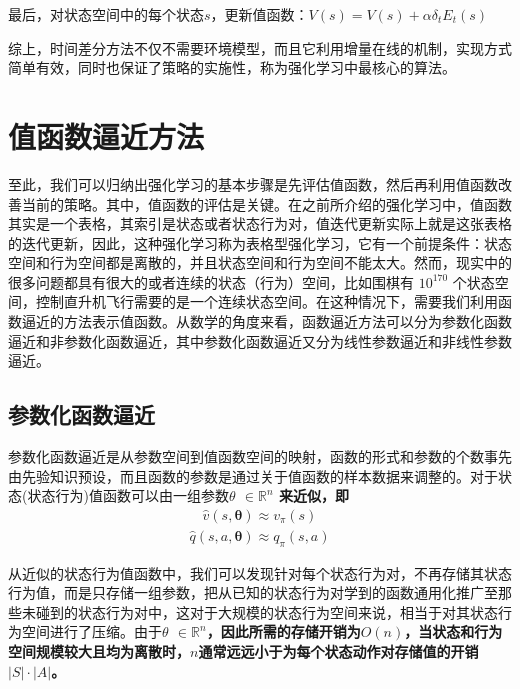最后，对状态空间中的每个状态$s$，更新值函数：$V(s)=V(s)+\alpha \delta_{t} E_{t}(s)$

综上，时间差分方法不仅不需要环境模型，而且它利用增量在线的机制，实现方式简单有效，同时也保证了策略的实施性，称为强化学习中最核心的算法。

\section{值函数逼近方法}
至此，我们可以归纳出强化学习的基本步骤是先评估值函数，然后再利用值函数改善当前的策略。其中，值函数的评估是关键。在之前所介绍的强化学习中，值函数其实是一个表格，其索引是状态或者状态行为对，值迭代更新实际上就是这张表格的迭代更新，因此，这种强化学习称为表格型强化学习，它有一个前提条件：状态空间和行为空间都是离散的，并且状态空间和行为空间不能太大。然而，现实中的很多问题都具有很大的或者连续的状态（行为）空间，比如围棋有 $10^{170}$  个状态空间，控制直升机飞行需要的是一个连续状态空间。在这种情况下，需要我们利用函数逼近的方法表示值函数。从数学的角度来看，函数逼近方法可以分为参数化函数逼近和非参数化函数逼近，其中参数化函数逼近又分为线性参数逼近和非线性参数逼近。

\subsection{参数化函数逼近}
参数化函数逼近是从参数空间到值函数空间的映射，函数的形式和参数的个数事先由先验知识预设，而且函数的参数是通过关于值函数的样本数据来调整的。对于状态(状态行为)值函数可以由一组参数\bfseries $\theta$ \mdseries $\in \mathbb{R}^{n} $ 来近似，即
\begin{equation}
\label{seq_2_3_1}
\begin{aligned}
\hat{v}(s,\bm{\theta})\approx v_{\pi}(s)
\end{aligned}
\end{equation}
\begin{equation}
\label{seq_2_3_2}
\begin{aligned}
\hat{q}(s,a,\bm{\theta})\approx q_{\pi}(s,a)
\end{aligned}
\end{equation}

从近似的状态行为值函数中，我们可以发现针对每个状态行为对，不再存储其状态行为值，而是只存储一组参数，把从已知的状态行为对学到的函数通用化推广至那些未碰到的状态行为对中，这对于大规模的状态行为空间来说，相当于对其状态行为空间进行了压缩。由于\bfseries $\theta$ \mdseries $\in \mathbb{R}^{n}$，因此所需的存储开销为$O(n)$，当状态和行为空间规模较大且均为离散时，$n$通常远远小于为每个状态动作对存储值的开销$|S|\cdot|A|$。

